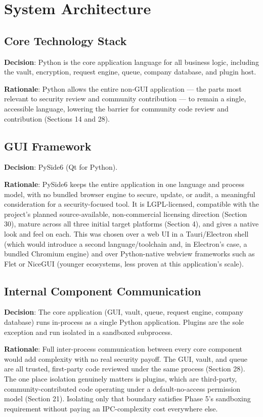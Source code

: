 \chapter{System Architecture}

\section{Core Technology Stack}
\textbf{Decision}:  Python is the core application language for all business logic, including the vault, encryption, request engine, queue, company database, and plugin host.

\textbf{Rationale}:  Python allows the entire non-GUI application — the parts most relevant to security review and community contribution — to remain a single, accessible language, lowering the barrier for community code review and contribution (Sections 14 and 28).
\section{GUI Framework}
\textbf{Decision}:  PySide6 (Qt for Python).

\textbf{Rationale}:  PySide6 keeps the entire application in one language and process model, with no bundled browser engine to secure, update, or audit, a meaningful consideration for a security-focused tool. It is LGPL-licensed, compatible with the project's planned source-available, non-commercial licensing direction (Section 30), mature across all three initial target platforms (Section 4), and gives a native look and feel on each. This was chosen over a web UI in a Tauri/Electron shell (which would introduce a second language/toolchain and, in Electron's case, a bundled Chromium engine) and over Python-native webview frameworks such as Flet or NiceGUI (younger ecosystems, less proven at this application's scale).
\section{Internal Component Communication}
\textbf{Decision}:  The core application (GUI, vault, queue, request engine, company database) runs in-process as a single Python application. Plugins are the sole exception and run isolated in a sandboxed subprocess.

\textbf{Rationale}:  Full inter-process communication between every core component would add complexity with no real security payoff. The GUI, vault, and queue are all trusted, first-party code reviewed under the same process (Section 28). The one place isolation genuinely matters is plugins, which are third-party, community-contributed code operating under a default-no-access permission model (Section 21). Isolating only that boundary satisfies Phase 5's sandboxing requirement without paying an IPC-complexity cost everywhere else.
